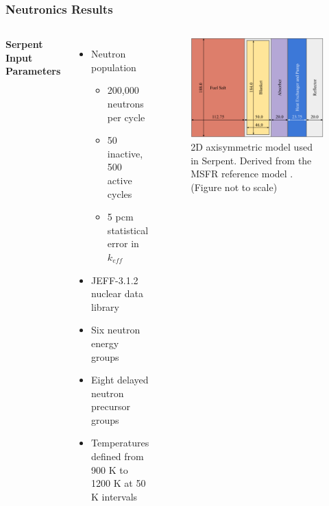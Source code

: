 \begin{frame}
	\frametitle{Neutronics Results}
		\begin{columns}
			\column{5cm}
				\textbf{Serpent Input Parameters}
					\begin{itemize}
						\item Neutron population
							\begin{itemize}
								\item 200,000 neutrons per cycle
								\item 50 inactive, 500 active cycles
								\item 5 pcm statistical error in $k_{eff}$
							\end{itemize}
						\item JEFF-3.1.2 nuclear data library
						\item Six neutron energy groups
						\item Eight delayed neutron precursor groups
						\item Temperatures defined from 900 K to 1200 K at 50 K
						intervals
					\end{itemize}
			\column{5.5cm}
				\begin{figure}
					\centering
					\includegraphics[width=\textwidth]
					{./images/reference}
					\caption{2D axisymmetric model used in Serpent. Derived from
					the \gls{MSFR} reference model
					\cite{fiorina_modelling_2014}. (Figure not to scale)}
					\label{fig:reference}
				\end{figure}
		\end{columns}
\end{frame}

